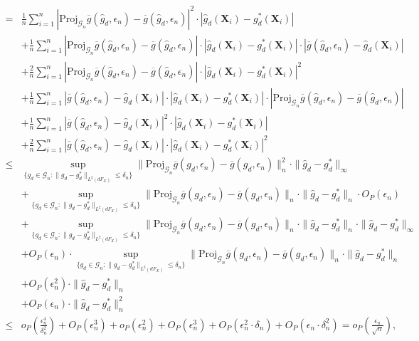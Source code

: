 \documentclass[11pt]{article}
\numberwithin{equation}{section}
\begin{document}
\begin{align*}
	=&  \frac{1}{n}\sum_{i=1}^n|\text{Proj}_{\mathcal{G}_n}\overline{g}(\widehat{g}_d,\epsilon_n)-\overline{g}(\widehat{g}_d,\epsilon_n)|^2 \cdot|\widehat{g}_d(\boldsymbol{X}_i)-g_d^*(\boldsymbol{X}_i)| \\
	&+ \frac{1}{n}\sum_{i=1}^n|\text{Proj}_{\mathcal{G}_n}\overline{g}(\widehat{g}_d,\epsilon_n)-\overline{g}(\widehat{g}_d,\epsilon_n)| \cdot|\widehat{g}_d(\boldsymbol{X}_i)-g_d^*(\boldsymbol{X}_i)|\cdot |\overline{g}(\widehat{g}_d,\epsilon_n)-\widehat{g}_d(\boldsymbol{X}_i)|\\
	&+  \frac{2}{n}\sum_{i=1}^n|\text{Proj}_{\mathcal{G}_n}\overline{g}(\widehat{g}_d,\epsilon_n)-\overline{g}(\widehat{g}_d,\epsilon_n)| \cdot|\widehat{g}_d(\boldsymbol{X}_i)-g_d^*(\boldsymbol{X}_i)|^2\\
	&+  \frac{1}{n}\sum_{i=1}^n|\overline{g}(\widehat{g}_d,\epsilon_n)-\widehat{g}_d(\boldsymbol{X}_i)|\cdot|\widehat{g}_d(\boldsymbol{X}_i)-g_d^*(\boldsymbol{X}_i)|\cdot |\text{Proj}_{\mathcal{G}_n}\overline{g}(\widehat{g}_d,\epsilon_n)-\overline{g}(\widehat{g}_d,\epsilon_n)|\\
	&+ \frac{1}{n}\sum_{i=1}^n|\overline{g}(\widehat{g}_d,\epsilon_n)-\widehat{g}_d(\boldsymbol{X}_i)|^2\cdot|\widehat{g}_d(\boldsymbol{X}_i)-g_d^*(\boldsymbol{X}_i)|\\
	&+ \frac{2}{n}\sum_{i=1}^n|\overline{g}(\widehat{g}_d,\epsilon_n)-\widehat{g}_d(\boldsymbol{X}_i)|\cdot|\widehat{g}_d(\boldsymbol{X}_i)-g_d^*(\boldsymbol{X}_i)|^2\\
	\leq & \sup_{\{{g}_d\in\mathcal{G}_n:\|{g}_d-g_d^*\|_{L^2(dF_X)}\leq \delta_n\}}\|\text{Proj}_{\mathcal{G}_n}\overline{g}({g}_d,\epsilon_n)-\overline{g}({g}_d,\epsilon_n)\|^2_{n}\cdot  \|\widehat{g}_d-g_d^*\|_{\infty} \\
	&+  \sup_{\{{g}_d\in\mathcal{G}_n:\|{g}_d-g_d^*\|_{L^2(dF_X)}\leq \delta_n\}}\|\text{Proj}_{\mathcal{G}_n}\overline{g}({g}_d,\epsilon_n)-\overline{g}({g}_d,\epsilon_n)\|_{n}\cdot \|\widehat{g}_d-g_d^*\|_{n} \cdot O_P(\epsilon_n)\\
	&+ \sup_{\{{g}_d\in\mathcal{G}_n:\|{g}_d-g_d^*\|_{L^2(dF_X)}\leq \delta_n\}}\|\text{Proj}_{\mathcal{G}_n}\overline{g}({g}_d,\epsilon_n)-\overline{g}({g}_d,\epsilon_n)\|_{n}\cdot  \|\widehat{g}_d-g_d^*\|_{n}\cdot \|\widehat{g}_d-g_d^*\|_{\infty}  \\
	&+ O_P(\epsilon_n)\cdot \sup_{\{{g}_d\in\mathcal{G}_n:\|{g}_d-g_d^*\|_{L^2(dF_X)}\leq \delta_n\}}\|\text{Proj}_{\mathcal{G}_n}\overline{g}({g}_d,\epsilon_n)-\overline{g}({g}_d,\epsilon_n)\|_{n}\cdot\|\widehat{g}_d-g_d^*\|_{n} \\
	&+O_P(\epsilon_n^2) \cdot \|\widehat{g}_d-g_d^*\|_{n}\\
	&+ O_P(\epsilon_n) \cdot \|\widehat{g}_d-g_d^*\|^2_{n} \\
	\leq & o_P\left(\frac{\epsilon_n^4}{\delta_n^2}\right)+O_P\left(\epsilon_n^3\right)+o_P\left(\epsilon_n^2\right)+O_P\left(\epsilon_n^3\right)+O_P(\epsilon_n^2\cdot \delta_n)+O_P(\epsilon_n\cdot \delta_n^2)=o_P\left(\frac{\epsilon_n}{\sqrt{n}}\right),
\end{align*}
\end{document}
